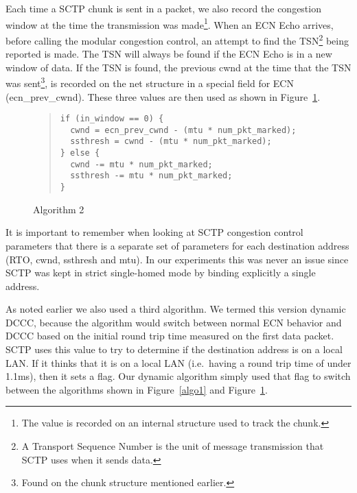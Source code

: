 \documentclass[12pt]{article}
\begin{document}
Each time a SCTP chunk is sent in a packet, we also record the congestion
window at the time the transmission was made\footnote{The value is recorded
on an internal structure used to track the chunk.}. When an ECN Echo arrives, before calling
the modular congestion control, an attempt to find the
TSN\footnote{A Transport Sequence Number is the unit of message transmission that
SCTP uses when it sends data.}  being reported is made. The TSN
will always be found if the ECN Echo is in a new window of data. If the TSN
is found, the previous cwnd at the time that the TSN was sent\footnote{Found on the chunk structure mentioned earlier.}, is recorded on
the net structure in a special field for ECN (ecn\_prev\_cwnd).  These three values are then used as shown in Figure~\ref{algo2}.


\begin{figure}[!h]
\begin{quote}
\begin{verbatim}
if (in_window == 0) {
  cwnd = ecn_prev_cwnd - (mtu * num_pkt_marked);
  ssthresh = cwnd - (mtu * num_pkt_marked); 
} else {
  cwnd -= mtu * num_pkt_marked;
  ssthresh -= mtu * num_pkt_marked;
}
\end{verbatim}
\end{quote}
\caption{Algorithm 2}
\label{algo2}
\end{figure}

It is important to remember when looking at SCTP congestion control
parameters that there
is a separate set of parameters for each destination address (RTO, cwnd, ssthresh and mtu). In
our experiments this was never an issue since SCTP was kept in strict single-homed mode
by binding explicitly a single address. 

As noted earlier we also used a third algorithm. We termed this version dynamic DCCC, because the algorithm would switch between normal ECN behavior and DCCC based on the
initial round trip time measured on the first data packet. SCTP uses this value to try to determine
if the destination address is on a local LAN. If it thinks that it is on a local LAN (i.e.~having a round
trip time of under 1.1ms), then it sets a flag. Our dynamic algorithm simply used
that flag to switch between the algorithms shown in Figure~\ref{algo1} and Figure~\ref{algo2}.
\end{document}
